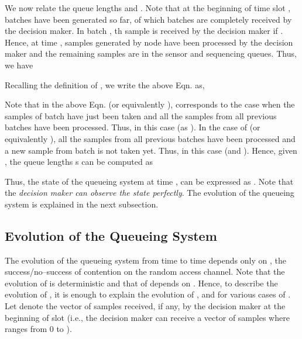 \documentclass[acmtosn]{acmtrans2m}
\begin{document}
We now relate the queue lengths  and . Note that 
at the beginning of time slot ,  
batches have been generated so far, of which  batches are 
completely received by the decision maker. In batch , th sample
is received by the decision maker if . Hence, at time
,  samples generated by node  
have been processed by the decision maker and the remaining samples are in the 
sensor and sequencing queues. Thus, we have 

Recalling the definition of , we write the above Eqn. as, 
     
Note that in the above Eqn.  (or equivalently ), 
corresponds to the case when the samples of batch  have just been taken 
and all the samples from all previous batches have been processed. Thus,
in this case  (as ). In the case of 
 (or equivalently ), all the samples 
from all previous batches have been processed and a new sample from batch 
 is not taken yet. Thus, in this case  (and ).   
Hence, given ,
the queue lengths s can be computed as 

Thus, the state of the queueing system at time , can be expressed as 
.
Note that the {\em decision maker can observe the state  
perfectly}. The evolution of the queueing system is explained in the next subsection.

\subsection{Evolution of the Queueing System}
\label{subsec:evol-Q}
The evolution of the queueing system from time  to time  depends
only on , the success/no--success of contention on the random
access channel. Note that the evolution of  is deterministic
and that of  depends on . Hence, to describe the
evolution of , it is enough to explain the evolution of , and  for various cases of . Let 
denote the vector of samples received, if any, by the decision maker at
the beginning of slot  (i.e., the decision maker can receive a
vector of  samples where  ranges from 0 to ).
 
\vspace{4mm}
\end{document}
